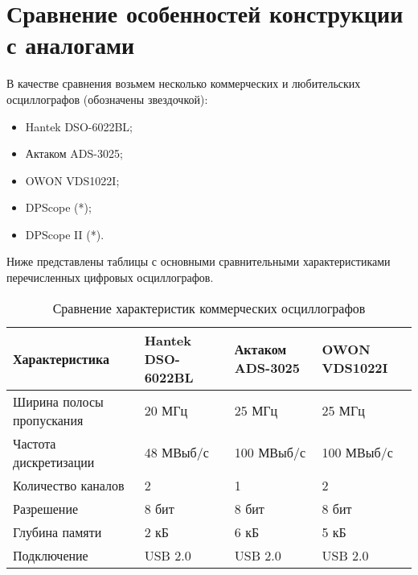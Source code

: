 \section{Сравнение особенностей конструкции с аналогами}

В качестве сравнения возьмем несколько коммерческих и любительских осциллографов (обозначены звездочкой):
\begin{itemize}
    \item Hantek DSO-6022BL;
    \item Актаком ADS-3025;
    \item OWON VDS1022I;
    \item DPScope (*);
    \item DPScope II (*).
\end{itemize}

Ниже представлены таблицы с основными сравнительными характеристиками перечисленных цифровых осциллографов.

\begin{table}[H]
    \caption{Сравнение характеристик коммерческих осциллографов}
    \label{tab:oscilloscope-comparison-1}
    
    \begin{tabularx}{\textwidth}{|l|X|X|X|}
        \hline
        Характеристика & Hantek DSO-6022BL & Актаком ADS-3025 & OWON VDS1022I \\
        \hline
        Ширина полосы пропускания & 20 МГц & 25 МГц & 25 МГц \\
        \hline
        Частота дискретизации & 48 МВыб/с & 100 МВыб/с & 100 МВыб/с \\
        \hline
        Количество каналов & 2 & 1 & 2 \\
        \hline
        Разрешение & 8 бит & 8 бит & 8 бит \\
        \hline
        Глубина памяти & 2 кБ & 6 кБ & 5 кБ \\
        \hline
        Подключение & USB 2.0 & USB 2.0 & USB 2.0 \\
        \hline
    \end{tabularx}
\end{table}

